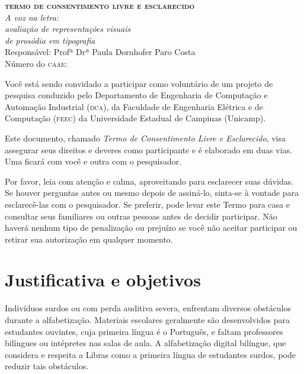 \documentclass[a4paper,11pt,titlepage,singlespacing]{article}
\begin{document}


	\begin{center}
		\textbf{\Large{\textsc{termo de consentimento livre e esclarecido}}}\\
        \vspace{5pt}
        \huge\textit{A voz na letra: \\ avaliação de representações visuais \\ de prosódia em tipografia}\\
        \vspace{20pt}
        \large{Responsável: Profª Drª Paula Dornhofer Paro Costa}\\
        \vspace{10pt}
        Número do \textsc{caae}: \\
        \vspace{15pt}
	\end{center}

\noindent Você está sendo convidado a participar como voluntário de um projeto de pesquisa conduzido pelo Departamento de Engenharia de Computação e Automação Industrial (\textsc{dca}), da Faculdade de Engenharia Elétrica e de Computação (\textsc{feec}) da Universidade Estadual de Campinas (Unicamp).

Este documento, chamado \textit{Termo de Consentimento Livre e Esclarecido}, visa assegurar seus direitos e deveres como participante e é elaborado em duas vias. Uma ficará com você e outra com o pesquisador.

Por favor, leia com atenção e calma, aproveitando para esclarecer suas dúvidas. Se houver perguntas antes ou mesmo depois de assiná-lo, sinta-se à vontade para esclarecê-las com o pesquisador. Se preferir, pode levar este Termo para casa e consultar seus familiares ou outras pessoas antes de decidir participar. Não haverá nenhum tipo de penalização ou prejuízo se você não aceitar participar ou retirar sua
autorização em qualquer momento.


\section*{Justificativa e objetivos}

\noindent Indivíduos surdos ou com perda auditiva severa, enfrentam diversos obstáculos durante a alfabetização. Materiais escolares geralmente são desenvolvidos para estudantes ouvintes, cuja primeira língua é o Português, e faltam professores bilíngues ou intépretes nas salas de aula. A alfabetização digital bilíngue, que considera e respeita a Libras como a primeira língua de estudantes surdos, pode reduzir tais obstáculos.
\end{document}
